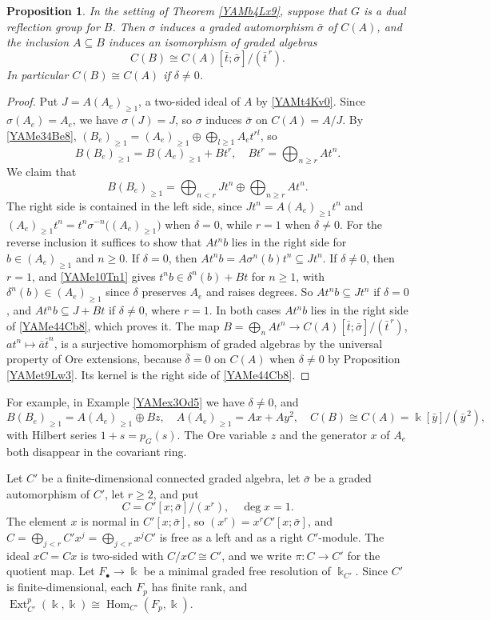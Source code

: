 \documentclass[reqno]{amsart}
\numberwithin{equation}{section}
\newtheorem{proposition}[equation]{Proposition}
\theoremstyle{definition}
\theoremstyle{remark}
\theoremstyle{plain}
\newcommand{\kk}{\Bbbk}
\DeclareMathOperator{\Ext}{Ext}
\DeclareMathOperator{\Hom}{Hom}
\begin{document}
\begin{proposition}\label{YAMcv1Ka7}
In the setting of Theorem \ref{YAMb4Lx9}, suppose that $G$ is a dual reflection group for $B$. Then $\sigma$ induces a graded automorphism $\bar\sigma$ of $C(A)$, and the inclusion $A\subseteq B$ induces an isomorphism of graded algebras
\[
C(B)\cong C(A)[\bar t;\bar\sigma]/(\bar t^{\,r}).
\]
In particular $C(B)\cong C(A)$ if $\delta\neq0$.
\end{proposition}

\begin{proof}
Put $J=A(A_e)_{\ge1}$, a two-sided ideal of $A$ by \eqref{YAMt4Kv0}. Since $\sigma(A_e)=A_e$, we have $\sigma(J)=J$, so $\sigma$ induces $\bar\sigma$ on $C(A)=A/J$. By \eqref{YAMe34Be8}, $(B_e)_{\ge1}=(A_e)_{\ge1}\oplus\bigoplus_{l\ge1}A_et^{rl}$, so
\[
B(B_e)_{\ge1}=B(A_e)_{\ge1}+Bt^r,\quad Bt^r=\bigoplus_{n\ge r}At^n.
\]
We claim that
\begin{equation}\label{YAMe44Cb8}
B(B_e)_{\ge1}=\bigoplus_{n<r}Jt^n\oplus\bigoplus_{n\ge r}At^n.
\end{equation}
The right side is contained in the left side, since $Jt^n=A(A_e)_{\ge1}t^n$ and $(A_e)_{\ge1}t^n=t^n\sigma^{-n}\big((A_e)_{\ge1}\big)$ when $\delta=0$, while $r=1$ when $\delta\neq0$. For the reverse inclusion it suffices to show that $At^nb$ lies in the right side for $b\in(A_e)_{\ge1}$ and $n\ge0$. If $\delta=0$, then $At^nb=A\sigma^n(b)t^n\subseteq Jt^n$. If $\delta\neq0$, then $r=1$, and \eqref{YAMe10Tn1} gives $t^nb\in\delta^n(b)+Bt$ for $n\ge1$, with $\delta^n(b)\in(A_e)_{\ge1}$ since $\delta$ preserves $A_e$ and raises degrees. So $At^nb\subseteq Jt^n$ if $\delta=0$, and $At^nb\subseteq J+Bt$ if $\delta\neq0$, where $r=1$. In both cases $At^nb$ lies in the right side of \eqref{YAMe44Cb8}, which proves it. The map $B=\bigoplus_nAt^n\to C(A)[\bar t;\bar\sigma]/(\bar t^{\,r})$, $at^n\mapsto\bar a\bar t^n$, is a surjective homomorphism of graded algebras by the universal property of Ore extensions, because $\bar\delta=0$ on $C(A)$ when $\delta\neq0$ by Proposition \ref{YAMet9Lw3}. Its kernel is the right side of \eqref{YAMe44Cb8}.
\end{proof}

For example, in Example \ref{YAMex3Od5} we have $\delta\neq0$, and
\[
B(B_e)_{\ge1}=A(A_e)_{\ge1}\oplus Bz,\quad A(A_e)_{\ge1}=Ax+Ay^2,\quad C(B)\cong C(A)=\kk[\bar y]/(\bar y^{\,2}),
\]
with Hilbert series $1+s=p_G(s)$. The Ore variable $z$ and the generator $x$ of $A_e$ both disappear in the covariant ring.

Let $C'$ be a finite-dimensional connected graded algebra, let $\bar\sigma$ be a graded automorphism of $C'$, let $r\ge2$, and put
\[
C=C'[x;\bar\sigma]/(x^r),\quad\deg x=1.
\]
The element $x$ is normal in $C'[x;\bar\sigma]$, so $(x^r)=x^rC'[x;\bar\sigma]$, and $C=\bigoplus_{j<r}C'x^j=\bigoplus_{j<r}x^jC'$ is free as a left and as a right $C'$-module. The ideal $xC=Cx$ is two-sided with $C/xC\cong C'$, and we write $\pi\colon C\to C'$ for the quotient map. Let $F_\bullet\to\kk$ be a minimal graded free resolution of $\kk_{C'}$. Since $C'$ is finite-dimensional, each $F_p$ has finite rank, and $\Ext^p_{C'}(\kk,\kk)\cong\Hom_{C'}(F_p,\kk)$.
\end{document}
